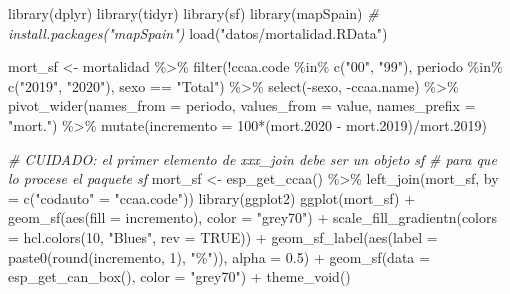\documentclass[
  spanish,
]{book}
\newenvironment{Shaded}{\begin{snugshade}}{\end{snugshade}}
\newcommand{\AttributeTok}[1]{\textcolor[rgb]{0.77,0.63,0.00}{#1}}
\newcommand{\CommentTok}[1]{\textcolor[rgb]{0.56,0.35,0.01}{\textit{#1}}}
\newcommand{\ConstantTok}[1]{\textcolor[rgb]{0.00,0.00,0.00}{#1}}
\newcommand{\DecValTok}[1]{\textcolor[rgb]{0.00,0.00,0.81}{#1}}
\newcommand{\FloatTok}[1]{\textcolor[rgb]{0.00,0.00,0.81}{#1}}
\newcommand{\FunctionTok}[1]{\textcolor[rgb]{0.00,0.00,0.00}{#1}}
\newcommand{\NormalTok}[1]{#1}
\newcommand{\OtherTok}[1]{\textcolor[rgb]{0.56,0.35,0.01}{#1}}
\newcommand{\SpecialCharTok}[1]{\textcolor[rgb]{0.00,0.00,0.00}{#1}}
\newcommand{\StringTok}[1]{\textcolor[rgb]{0.31,0.60,0.02}{#1}}
\theoremstyle{break}
\theoremstyle{definition}
\theoremstyle{definition}
\theoremstyle{definition}
\theoremstyle{definition}
\theoremstyle{remark}
\begin{document}
\begin{Shaded}
\begin{Highlighting}[]
\FunctionTok{library}\NormalTok{(dplyr)}
\FunctionTok{library}\NormalTok{(tidyr)}
\FunctionTok{library}\NormalTok{(sf)}
\FunctionTok{library}\NormalTok{(mapSpain) }\CommentTok{\# install.packages("mapSpain")}
\FunctionTok{load}\NormalTok{(}\StringTok{"datos/mortalidad.RData"}\NormalTok{)}

\NormalTok{mort\_sf }\OtherTok{\textless{}{-}}\NormalTok{ mortalidad }\SpecialCharTok{\%\textgreater{}\%}
  \FunctionTok{filter}\NormalTok{(}\SpecialCharTok{!}\NormalTok{ccaa.code }\SpecialCharTok{\%in\%} \FunctionTok{c}\NormalTok{(}\StringTok{"00"}\NormalTok{, }\StringTok{"99"}\NormalTok{), periodo }\SpecialCharTok{\%in\%} \FunctionTok{c}\NormalTok{(}\StringTok{"2019"}\NormalTok{, }\StringTok{"2020"}\NormalTok{), sexo }\SpecialCharTok{==} \StringTok{"Total"}\NormalTok{) }\SpecialCharTok{\%\textgreater{}\%}
  \FunctionTok{select}\NormalTok{(}\SpecialCharTok{{-}}\NormalTok{sexo, }\SpecialCharTok{{-}}\NormalTok{ccaa.name) }\SpecialCharTok{\%\textgreater{}\%}
  \FunctionTok{pivot\_wider}\NormalTok{(}\AttributeTok{names\_from =}\NormalTok{ periodo, }\AttributeTok{values\_from =}\NormalTok{ value, }\AttributeTok{names\_prefix =} \StringTok{"mort."}\NormalTok{) }\SpecialCharTok{\%\textgreater{}\%}
  \FunctionTok{mutate}\NormalTok{(}\AttributeTok{incremento =} \DecValTok{100}\SpecialCharTok{*}\NormalTok{(mort}\FloatTok{.2020} \SpecialCharTok{{-}}\NormalTok{ mort}\FloatTok{.2019}\NormalTok{)}\SpecialCharTok{/}\NormalTok{mort}\FloatTok{.2019}\NormalTok{)}

\CommentTok{\# CUIDADO: el primer elemento de xxx\_join debe ser un objeto sf}
\CommentTok{\# para que lo procese el paquete sf}
\NormalTok{mort\_sf }\OtherTok{\textless{}{-}} \FunctionTok{esp\_get\_ccaa}\NormalTok{() }\SpecialCharTok{\%\textgreater{}\%}
  \FunctionTok{left\_join}\NormalTok{(mort\_sf, }\AttributeTok{by =} \FunctionTok{c}\NormalTok{(}\StringTok{"codauto"} \OtherTok{=} \StringTok{"ccaa.code"}\NormalTok{))}
\FunctionTok{library}\NormalTok{(ggplot2)}
\FunctionTok{ggplot}\NormalTok{(mort\_sf) }\SpecialCharTok{+}
  \FunctionTok{geom\_sf}\NormalTok{(}\FunctionTok{aes}\NormalTok{(}\AttributeTok{fill =}\NormalTok{ incremento), }\AttributeTok{color =} \StringTok{"grey70"}\NormalTok{) }\SpecialCharTok{+}
  \FunctionTok{scale\_fill\_gradientn}\NormalTok{(}\AttributeTok{colors =} \FunctionTok{hcl.colors}\NormalTok{(}\DecValTok{10}\NormalTok{, }\StringTok{"Blues"}\NormalTok{, }\AttributeTok{rev =} \ConstantTok{TRUE}\NormalTok{)) }\SpecialCharTok{+}
  \FunctionTok{geom\_sf\_label}\NormalTok{(}\FunctionTok{aes}\NormalTok{(}\AttributeTok{label =} \FunctionTok{paste0}\NormalTok{(}\FunctionTok{round}\NormalTok{(incremento, }\DecValTok{1}\NormalTok{), }\StringTok{"\%"}\NormalTok{)), }\AttributeTok{alpha =} \FloatTok{0.5}\NormalTok{) }\SpecialCharTok{+}
  \FunctionTok{geom\_sf}\NormalTok{(}\AttributeTok{data =} \FunctionTok{esp\_get\_can\_box}\NormalTok{(), }\AttributeTok{color =} \StringTok{"grey70"}\NormalTok{) }\SpecialCharTok{+} 
  \FunctionTok{theme\_void}\NormalTok{()}
\end{Highlighting}
\end{Shaded}
\end{document}
